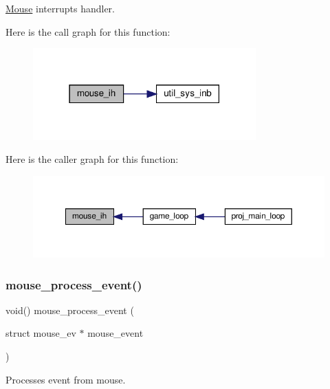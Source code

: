\hyperlink{structMouse}{Mouse} interrupts handler. 

Here is the call graph for this function\+:
\nopagebreak
\begin{figure}[H]
\begin{center}
\leavevmode
\includegraphics[width=243pt]{group__mouse_ga210374b50462acdedab00df64d5cea3c_cgraph}
\end{center}
\end{figure}
Here is the caller graph for this function\+:
\nopagebreak
\begin{figure}[H]
\begin{center}
\leavevmode
\includegraphics[width=350pt]{group__mouse_ga210374b50462acdedab00df64d5cea3c_icgraph}
\end{center}
\end{figure}
\mbox{\label{group__mouse_gadd8392c6469ceff59d345a3a7ff1027a}} 
\subsubsection{\texorpdfstring{mouse\+\_\+process\+\_\+event()}{mouse\_process\_event()}}
{\footnotesize\ttfamily void() mouse\+\_\+process\+\_\+event (\begin{DoxyParamCaption}\item[{struct mouse\+\_\+ev $\ast$}]{mouse\+\_\+event }\end{DoxyParamCaption})}



Processes event from mouse. 

